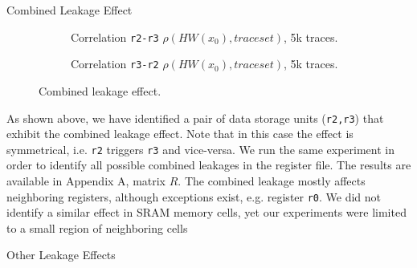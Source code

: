 \begin{subsection}{Combined Leakage Effect}
\begin{figure}[H]
\centering
\begin{subfigure}[b]{0.47\textwidth}
	\caption{\scriptsize{Correlation \texttt{r2-r3} $\rho(HW(x_0),traceset)$, 5k traces.}}
\end{subfigure}
\begin{subfigure}[b]{0.47\textwidth}
	\caption{\scriptsize{Correlation \texttt{r3-r2} $\rho(HW(x_0),traceset)$, 5k traces.}}
\end{subfigure}

\caption{Combined leakage effect.}\label{fig:regleak}
\end{figure}


\end{subsection}
As shown above, we have identified a pair of data storage units (\texttt{r2,r3}) that exhibit the combined leakage effect. Note that in this case the effect is symmetrical, i.e. \texttt{r2} triggers \texttt{r3} and vice-versa. We run the same experiment in order to identify all possible combined leakages in the register file. The results are available in Appendix A, matrix $R$. The combined leakage mostly affects neighboring registers, although exceptions exist, e.g. register \texttt{r0}. We did not identify a similar effect in SRAM memory cells, yet our experiments were limited to a small region of neighboring cells 

\begin{subsection}{Other Leakage Effects}

\end{subsection}


